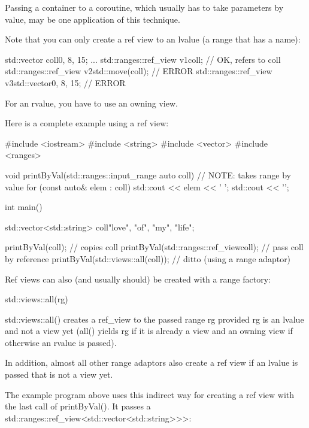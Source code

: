 Passing a container to a coroutine, which usually has to take parameters by value, may be one application of this technique.

Note that you can only create a ref view to an lvalue (a range that has a name):

\begin{cpp}
std::vector coll{0, 8, 15};
...
std::ranges::ref_view v1{coll}; // OK, refers to coll
std::ranges::ref_view v2{std::move(coll)}; // ERROR
std::ranges::ref_view v3{std::vector{0, 8, 15}}; // ERROR
\end{cpp}

For an rvalue, you have to use an owning view.

Here is a complete example using a ref view:


\begin{cpp}
#include <iostream>
#include <string>
#include <vector>
#include <ranges>

void printByVal(std::ranges::input_range auto coll) // NOTE: takes range by value
{
	for (const auto& elem : coll) {
		std::cout << elem << ' ';
	}
	std::cout << '\n';
}

int main()
{
	std::vector<std::string> coll{"love", "of", "my", "life"};
	
	printByVal(coll); // copies coll
	printByVal(std::ranges::ref_view{coll}); // pass coll by reference
	printByVal(std::views::all(coll)); // ditto (using a range adaptor)
}
\end{cpp}


Ref views can also (and usually should) be created with a range factory:

\begin{cpp}
std::views::all(rg)
\end{cpp}

std::views::all() creates a ref\_view to the passed range rg provided rg is an lvalue and not a view yet (all() yields rg if it is already a view and an owning view if otherwise an rvalue is passed).

In addition, almost all other range adaptors also create a ref view if an lvalue is passed that is not a view yet.

The example program above uses this indirect way for creating a ref view with the last call of printByVal(). It passes a std::ranges::ref\_view<std::vector<std::string>{}>{}>:

